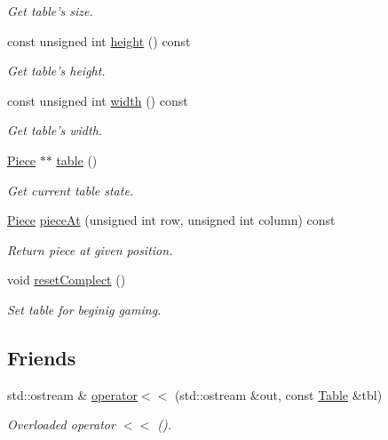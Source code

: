 \begin{DoxyCompactItemize}
\begin{DoxyCompactList}\small\item\em Get table's size. \item\end{DoxyCompactList}\item 
const unsigned int \hyperlink{classChEngn_1_1Table_a9502a1090bcb852c162934a792c2360a}{height} () const 
\begin{DoxyCompactList}\small\item\em Get table's height. \item\end{DoxyCompactList}\item 
const unsigned int \hyperlink{classChEngn_1_1Table_a6aaaaae9343e67a947b0cdeb6104361b}{width} () const 
\begin{DoxyCompactList}\small\item\em Get table's width. \item\end{DoxyCompactList}\item 
\hyperlink{classChEngn_1_1Piece}{Piece} $\ast$$\ast$ \hyperlink{classChEngn_1_1Table_a7fdd83660c669f80a3203f7e705ffdd9}{table} ()
\begin{DoxyCompactList}\small\item\em Get current table state. \item\end{DoxyCompactList}\item 
\hyperlink{classChEngn_1_1Piece}{Piece} \hyperlink{classChEngn_1_1Table_a9354d8fd4f32bfbee64a4ff63edea055}{pieceAt} (unsigned int row, unsigned int column) const 
\begin{DoxyCompactList}\small\item\em Return piece at given position. \item\end{DoxyCompactList}\item 
void \hyperlink{classChEngn_1_1Table_a8ece9e9f9f28f209d72f16db0fb2aeed}{resetComplect} ()
\begin{DoxyCompactList}\small\item\em Set table for beginig gaming. \item\end{DoxyCompactList}\end{DoxyCompactItemize}
\subsection*{Friends}
\begin{DoxyCompactItemize}
\item 
std::ostream \& \hyperlink{classChEngn_1_1Table_a9a39b79ad3a5635dfe8075f14598886e}{operator$<$$<$} (std::ostream \&out, const \hyperlink{classChEngn_1_1Table}{Table} \&tbl)
\begin{DoxyCompactList}\small\item\em Overloaded operator $<$$<$ (). \item\end{DoxyCompactList}\end{DoxyCompactItemize}



